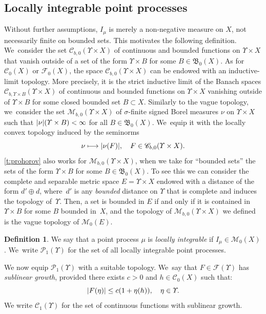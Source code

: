 \documentclass[10pt]{amsart}
\newcommand\mto{\mathchoice{\longmapsto}{\mapsto}{\mapsto}{\mapsto}}
\theoremstyle{definition}
\newtheorem{definition}[theorem]{Definition}
\theoremstyle{remark}
\DeclarePairedDelimiter{\abs}{\lvert}{\rvert}
\begin{document}
\subsection{Locally integrable point processes}\label{s:locally-integrable}
Without further assumptions, $I_{\mu}$ is merely a non-negative measure on $X$, not necessarily finite on bounded sets.
This motivates the following definition. We~consider the set $\mathscr{C}_{b,0}(\varUpsilon \times X)$ of continuous and bounded functions on $\varUpsilon \times X$ that vanish outside of a set of the form $\varUpsilon \times B$ for some $B \in \mathfrak{B}_{0}(X)$.
As for $\mathscr{C}_{0}(X)$ or $\mathscr{F}_{0}(X)$, the space $\mathscr{C}_{b,0}(\varUpsilon \times X)$ can be endowed with an inductive-limit topology.
More precisely, it is the strict inductive limit of the Banach spaces $\mathscr{C}_{b,\varUpsilon \times B}(\varUpsilon \times X)$ of continuous and bounded functions on $\varUpsilon \times X$ vanishing outside of $\varUpsilon \times B$ for some closed bounded set $B \subset X$.
Similarly to the vague topology, we~consider the set $\mathscr{M}_{b,0}(\varUpsilon \times X)$ of $\sigma$-finite signed Borel measures $\nu$ on $\varUpsilon \times X$ such that $\abs{\nu}(\varUpsilon \times B) < \infty$ for all $B \in \mathfrak{B}_{0}(X)$. We~equip it with the locally convex topology induced by the seminorms
\begin{equation*}
\nu \mto \abs{\nu(F)}, \quad F \in \mathscr{C}_{b,0}(\varUpsilon \times X).
\end{equation*}
\cref{t:prohorov} also works for $\mathscr{M}_{b,0}(\varUpsilon \times X)$, when we take for \enquote{bounded sets} the sets of the form $\varUpsilon \times B$ for some $B \in \mathfrak{B}_{0}(X)$.
To see this we can consider the complete and separable metric space $E = \varUpsilon \times X$ endowed with a distance of the form $d' \oplus d$, where~$d'$ is any \emph{bounded} distance on $\varUpsilon$ that is complete and induces the topology of~$\varUpsilon$.
Then, a set is bounded in $E$ if and only if it is contained in $\varUpsilon \times B$ for some $B$ bounded in~$X$, and the topology of $\mathscr{M}_{b,0}(\varUpsilon \times X)$ we defined is the vague topology of $\mathscr{M}_{0}(E)$.

\begin{definition}
We say that a point process $\mu$ is \emph{locally integrable} if $I_{\mu} \in \mathscr{M}_{0}(X)$. We~write $\mathscr{P}_{1}(\varUpsilon)$ for the set of all locally integrable point processes.
\end{definition}
We now equip $\mathscr{P}_{1}(\varUpsilon)$ with a suitable topology. We~say that $F \in \mathscr{F}(\varUpsilon)$ has \emph{sublinear growth}, provided there exists $c > 0$ and $h \in \mathscr{C}_{0}(X)$ such that:
\begin{equation*}
\abs{F(\eta)} \leq c (1 + \eta(h)), \quad \eta \in \varUpsilon.
\end{equation*}
We write $\mathscr{C}_{1}(\varUpsilon)$ for the set of continuous functions with sublinear growth.
\end{document}
